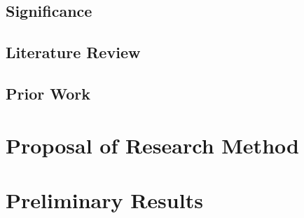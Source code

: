 \subsection{Significance}

\subsection{Literature Review}

\subsection{Prior Work}

\section{Proposal of Research Method}

\section{Preliminary Results}


